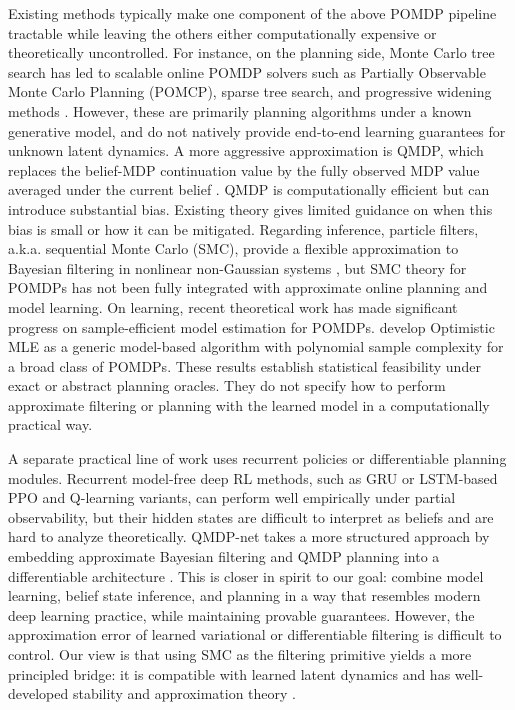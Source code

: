 Existing methods typically make one component of the above POMDP pipeline tractable while leaving the others either computationally expensive or theoretically uncontrolled. For instance, on the planning side, Monte Carlo tree search has led to scalable online POMDP solvers such as Partially Observable Monte Carlo Planning (POMCP), sparse tree search, and progressive widening methods \citep{silver2010monte,lim2021sparse,sunberg2018online}. However, these are primarily planning algorithms under a known generative model, and do not natively provide end-to-end learning guarantees for unknown latent dynamics.
A more aggressive approximation is QMDP, which replaces the belief-MDP continuation value by the fully observed MDP value averaged under the current belief \citep{littman1995learning}. QMDP is computationally efficient but can introduce substantial bias. Existing theory gives limited guidance on when this bias is small or how it can be mitigated. 
Regarding inference, particle filters, a.k.a. sequential Monte Carlo (SMC), provide a flexible approximation to Bayesian filtering in nonlinear non-Gaussian systems \citep{crisan2002survey,whiteley2013stability}, but SMC theory for POMDPs \citep{lim2021sparse,lim2023optimalityparticlepomdp} has not been fully integrated with approximate online planning and model learning. On learning, recent theoretical work has made significant progress on sample-efficient model estimation for POMDPs. \cite{liu2022partially,liu2023optimistic} develop Optimistic MLE as a generic model-based algorithm with polynomial sample complexity for a broad class of POMDPs. These results establish statistical feasibility under exact or abstract planning oracles. They do not specify how to perform approximate filtering or planning with the learned model in a computationally practical way.

A separate practical line of work uses recurrent policies or differentiable planning modules. Recurrent model-free deep RL methods, such as GRU or LSTM-based PPO and Q-learning variants, can perform well empirically under partial observability, but their hidden states are difficult to interpret as beliefs and are hard to analyze theoretically. QMDP-net takes a more structured approach by embedding approximate Bayesian filtering and QMDP planning into a differentiable architecture \citep{karkus2017qmdpnet}. This is closer in spirit to our goal: combine model learning, belief state inference, and planning in a way that resembles modern deep learning practice, while maintaining provable guarantees. However, the approximation error of learned variational or differentiable filtering is difficult to control. Our view is that using SMC as the filtering primitive yields a more principled bridge: it is compatible with learned latent dynamics and has well-developed stability and approximation theory \citep{crisan2002survey,whiteley2013stability}. 

